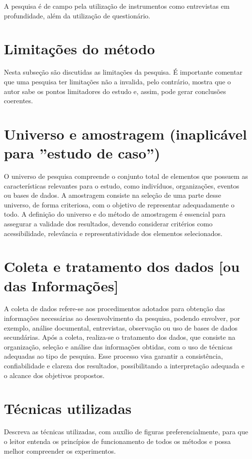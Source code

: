 A pesquisa é de campo pela utilização de instrumentos como entrevistas em profundidade, além da utilização de questionário.

\section{Limitações do método}
Nesta subseção são discutidas as limitações da pesquisa. É importante comentar que uma pesquisa ter limitações não a invalida, pelo contrário, mostra que o autor sabe os pontos limitadores do estudo e, assim, pode gerar conclusões coerentes.

\section{Universo e amostragem (inaplicável para ''estudo de caso'')}

O universo de pesquisa compreende o conjunto total de elementos que possuem as características relevantes para o estudo, como indivíduos, organizações, eventos ou bases de dados. A amostragem consiste na seleção de uma parte desse universo, de forma criteriosa, com o objetivo de representar adequadamente o todo. A definição do universo e do método de amostragem é essencial para assegurar a validade dos resultados, devendo considerar critérios como acessibilidade, relevância e representatividade dos elementos selecionados.

\section{Coleta e tratamento dos dados [ou das Informações]}

A coleta de dados refere-se aos procedimentos adotados para obtenção das informações necessárias ao desenvolvimento da pesquisa, podendo envolver, por exemplo, análise documental, entrevistas, observação ou uso de bases de dados secundárias. Após a coleta, realiza-se o tratamento dos dados, que consiste na organização, seleção e análise das informações obtidas, com o uso de técnicas adequadas ao tipo de pesquisa. Esse processo visa garantir a consistência, confiabilidade e clareza dos resultados, possibilitando a interpretação adequada e o alcance dos objetivos propostos.

\section{Técnicas utilizadas}

Descreva as técnicas utilizadas, com auxílio de figuras preferencialmente, para que o leitor entenda os princípios de funcionamento de todos os métodos e possa melhor compreender os experimentos.